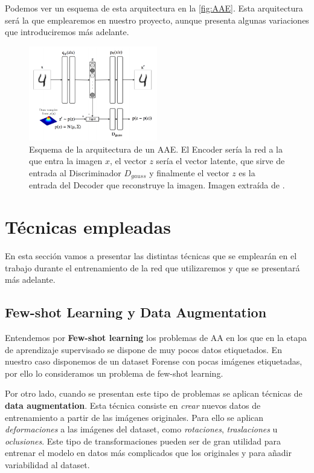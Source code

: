             \noindent Podemos ver un esquema de esta arquitectura en la \autoref{fig:AAE}. Esta arquitectura será la que emplearemos en nuestro proyecto, aunque presenta algunas variaciones que introduciremos más adelante.
            
            \begin{figure}[!h]
                \centering
                \includegraphics[width=0.5\textwidth]{img/AAE.png}
                \caption{Esquema de la arquitectura de un AAE. El Encoder sería la red a la que entra la imagen $x$, el vector $z$ sería el vector latente, que sirve de entrada al Discriminador $D_{gauss}$ y finalmente el vector $z$ es la entrada del Decoder que reconstruye la imagen. Imagen extraída de \cite{AAE}.}
                \label{fig:AAE}
            \end{figure}

            

\section{Técnicas empleadas}
    \noindent En esta sección vamos a presentar las distintas técnicas que se emplearán en el trabajo durante el entrenamiento de la red que utilizaremos y que se presentará más adelante. 

    \subsection{Few-shot Learning y Data Augmentation} \label{sub:data_augmentation}
        \noindent Entendemos por \textbf{Few-shot learning} los problemas de AA en los que en la etapa de aprendizaje supervisado se dispone de muy pocos datos etiquetados. En nuestro caso disponemos de un dataset Forense con pocas imágenes etiquetadas, por ello lo consideramos un problema de few-shot learning.

        \medskip

        \noindent Por otro lado, cuando se presentan este tipo de problemas se aplican técnicas de \textbf{data augmentation}. Esta técnica consiste en \textit{crear} nuevos datos de entrenamiento a partir de las imágenes originales. Para ello se aplican \textit{deformaciones} a las imágenes del dataset, como \textit{rotaciones}, \textit{traslaciones} u \textit{oclusiones}. Este tipo de transformaciones pueden ser de gran utilidad para entrenar el modelo en datos más complicados que los originales y para añadir variabilidad al dataset.
        
\endinput

